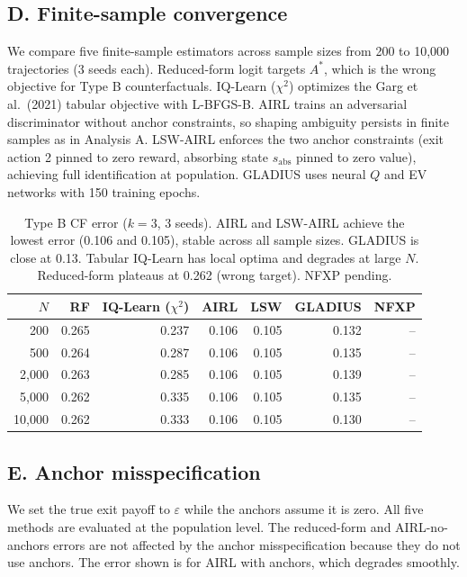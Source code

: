 \documentclass[11pt]{article}
\begin{document}
\subsection{D. Finite-sample convergence}

We compare five finite-sample estimators across sample sizes from 200 to 10{,}000 trajectories (3 seeds each). Reduced-form logit targets $A^*$, which is the wrong objective for Type B counterfactuals. IQ-Learn ($\chi^2$) optimizes the Garg et al.\ (2021) tabular objective with L-BFGS-B. AIRL trains an adversarial discriminator without anchor constraints, so shaping ambiguity persists in finite samples as in Analysis A. LSW-AIRL enforces the two anchor constraints (exit action 2 pinned to zero reward, absorbing state $s_{\mathrm{abs}}$ pinned to zero value), achieving full identification at population. GLADIUS uses neural $Q$ and EV networks with 150 training epochs.

\begin{table}[H]
\centering
\begin{tabular}{rrrrrrr}
\toprule
$N$ & RF & IQ-Learn ($\chi^2$) & AIRL & LSW & GLADIUS & NFXP \\
\midrule
200      & 0.265 & 0.237 & 0.106 & 0.105 & 0.132 & -- \\
500      & 0.264 & 0.287 & 0.106 & 0.105 & 0.135 & -- \\
2{,}000  & 0.263 & 0.285 & 0.106 & 0.105 & 0.139 & -- \\
5{,}000  & 0.262 & 0.335 & 0.106 & 0.105 & 0.135 & -- \\
10{,}000 & 0.262 & 0.333 & 0.106 & 0.105 & 0.130 & -- \\
\bottomrule
\end{tabular}
\caption{Type B CF error ($k=3$, 3 seeds). AIRL and LSW-AIRL achieve the lowest error (0.106 and 0.105), stable across all sample sizes. GLADIUS is close at 0.13. Tabular IQ-Learn has local optima and degrades at large $N$. Reduced-form plateaus at 0.262 (wrong target). NFXP pending.}
\label{tab:samplesize}
\end{table}

\subsection{E. Anchor misspecification}

We set the true exit payoff to $\varepsilon$ while the anchors assume it is zero. All five methods are evaluated at the population level. The reduced-form and AIRL-no-anchors errors are not affected by the anchor misspecification because they do not use anchors. The error shown is for AIRL with anchors, which degrades smoothly.
\end{document}
